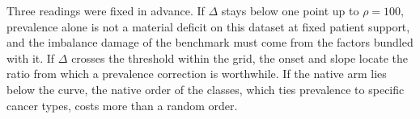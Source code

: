 \documentclass[11pt]{article}
\begin{document}
Three readings were fixed in advance. If $\Delta$ stays below one point up to $\rho=100$, prevalence alone is not a material deficit on this dataset at fixed patient support, and the imbalance damage of the benchmark must come from the factors bundled with it. If $\Delta$ crosses the threshold within the grid, the onset and slope locate the ratio from which a prevalence correction is worthwhile. If the native arm lies below the curve, the native order of the classes, which ties prevalence to specific cancer types, costs more than a random order.





\end{document}

